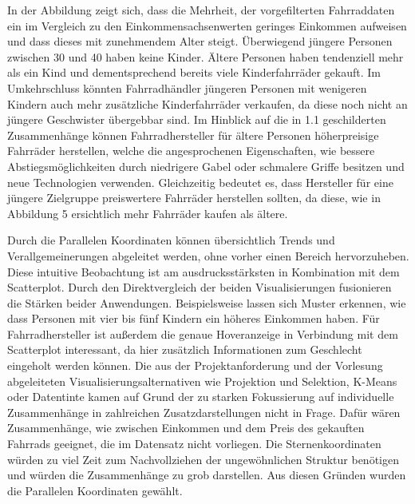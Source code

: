 \documentclass[usegeometry=true]{scrartcl}
\begin{document}
\newline In der Abbildung zeigt sich, dass die Mehrheit, der vorgefilterten Fahrraddaten ein im Vergleich zu den Einkommensachsenwerten geringes Einkommen aufweisen und dass dieses mit zunehmendem Alter steigt. Überwiegend jüngere Personen zwischen 30 und 40 haben keine Kinder. Ältere Personen haben tendenziell mehr als ein Kind und dementsprechend bereits viele Kinderfahrräder gekauft. Im Umkehrschluss könnten Fahrradhändler jüngeren Personen mit wenigeren Kindern auch mehr zusätzliche Kinderfahrräder verkaufen, da diese noch nicht an jüngere Geschwister übergebbar sind.
 Im Hinblick auf die in 1.1 geschilderten Zusammenhänge können Fahrradhersteller  für ältere Personen höherpreisige Fahrräder herstellen, welche die angesprochenen Eigenschaften, wie bessere Abstiegsmöglichkeiten durch niedrigere Gabel oder schmalere Griffe besitzen und neue Technologien verwenden. Gleichzeitig bedeutet es, dass Hersteller für eine jüngere Zielgruppe preiswertere Fahrräder herstellen sollten, da diese, wie in Abbildung 5 ersichtlich mehr Fahrräder kaufen als ältere.  

Durch die Parallelen Koordinaten können übersichtlich Trends und Verallgemeinerungen abgeleitet werden, ohne vorher einen Bereich hervorzuheben.  
Diese intuitive Beobachtung ist am ausdrucksstärksten in Kombination mit dem Scatterplot. Durch den Direktvergleich der beiden Visualisierungen fusionieren die Stärken beider Anwendungen. Beispielsweise lassen sich Muster erkennen, wie dass Personen mit vier bis fünf Kindern ein höheres Einkommen haben. Für Fahrradhersteller ist außerdem die genaue Hoveranzeige in Verbindung mit dem Scatterplot interessant, da hier zusätzlich Informationen zum Geschlecht eingeholt werden können. Die aus der Projektanforderung und der Vorlesung abgeleiteten Visualisierungsalternativen wie Projektion und Selektion, K-Means oder Datentinte kamen auf Grund der zu starken Fokussierung auf individuelle Zusammenhänge in zahlreichen Zusatzdarstellungen nicht in Frage. Dafür wären Zusammenhänge, wie zwischen Einkommen und dem Preis des gekauften Fahrrads geeignet, die im Datensatz nicht vorliegen. Die Sternenkoordinaten würden zu viel Zeit zum Nachvollziehen der ungewöhnlichen Struktur benötigen und würden die Zusammenhänge zu grob darstellen. Aus diesen Gründen wurden die Parallelen Koordinaten gewählt. 
\end{document}
